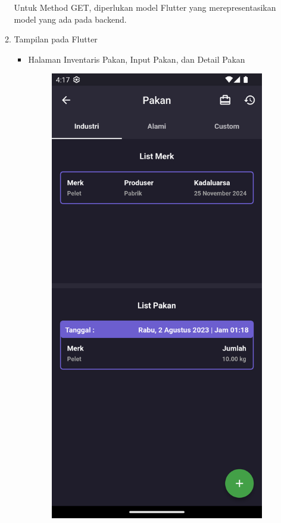 \begin{spacing}{1.5}
\begin{enumerate}
\begin{enumerate}
			Untuk Method GET, diperlukan model Flutter yang merepresentasikan model yang ada pada backend.

			\item Tampilan pada Flutter
			
			\begin{itemize}
				\item Halaman Inventaris Pakan, Input Pakan, dan Detail Pakan
				
				\begin{figure}[H]
						\includegraphics[width=\linewidth]{gambar/sprint4/inv_pakan.png}

\end{figure}
\end{itemize}
\end{enumerate}
\end{enumerate}
\end{spacing}
